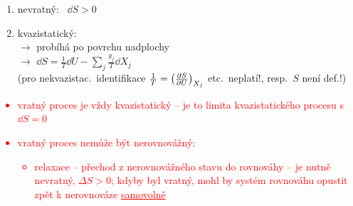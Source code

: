 \textcolor{NavyBlue}{
\begin{enumerate}[label=\roman*),nosep]
  \item nevratný: \ $\dd S > 0$
  \item kvazistatický: \\
  $\to$ probíhá po povrchu nadplochy \\
  $\to$ $\dd S = \frac1T\dd U - \sum_j\frac{y_j}{T}\dd X_j$ \\
  (pro nekvazistac.\ identifikace $\frac1T = \left(\pdv{S}{U}\right)_{X_j}$ etc.\ neplatí!, resp.\ $S$ není def.!)
\end{enumerate}}

\textcolor{Red}{
\begin{itemize}[nosep]
  \item[$\to$] vratný proces je vždy kvazistatický -- je to limita kvazistatického procesu s $\dd S = 0$
  \item[$\to$] vratný proces nemůže být nerovnovážný:
  \begin{itemize}[nosep]
    \item relaxace -- přechod z nerovnovážného stavu do rovnováhy -- je nutně nevratný, $\Delta S > 0$; kdyby byl vratný, mohl by systém rovnováhu opustit zpět k nerovnováze \underline{samovolně}
  \end{itemize}
\end{itemize}}

